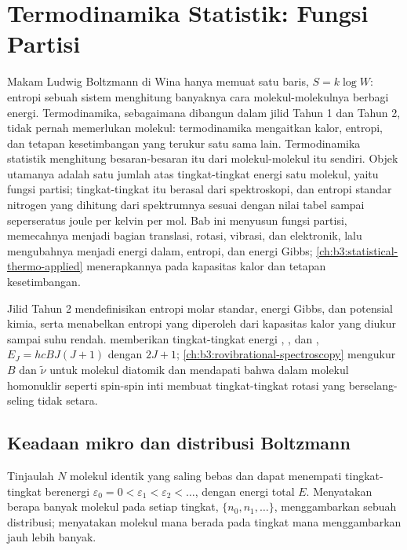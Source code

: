 \chapter{Termodinamika Statistik: Fungsi Partisi}\label{ch:b3:partition-functions}

Makam Ludwig Boltzmann di Wina hanya memuat satu baris, $S = k\log W$: entropi
sebuah sistem menghitung banyaknya cara molekul-molekulnya berbagi energi.
Termodinamika, sebagaimana dibangun dalam jilid Tahun 1 dan Tahun 2, tidak
pernah memerlukan molekul: termodinamika mengaitkan kalor, entropi, dan
tetapan kesetimbangan yang terukur satu sama lain. Termodinamika statistik
menghitung besaran-besaran itu dari molekul-molekul itu sendiri. Objek
utamanya adalah satu jumlah atas tingkat-tingkat energi satu molekul, yaitu
fungsi partisi; tingkat-tingkat itu berasal dari spektroskopi, dan entropi
standar nitrogen yang dihitung dari spektrumnya sesuai dengan nilai tabel
sampai seperseratus joule per kelvin per mol. Bab ini menyusun fungsi partisi,
memecahnya menjadi bagian translasi, rotasi, vibrasi, dan elektronik, lalu
mengubahnya menjadi energi dalam, entropi, dan energi Gibbs;
\cref{ch:b3:statistical-thermo-applied} menerapkannya pada kapasitas kalor dan
tetapan kesetimbangan.

\begin{recall}
Jilid Tahun 2 mendefinisikan entropi molar standar, energi Gibbs, dan potensial
kimia, serta menabelkan entropi yang diperoleh dari kapasitas kalor yang diukur
sampai suhu rendah.  memberikan tingkat-tingkat
energi , , dan ,
$E_J = hcBJ(J+1)$ dengan  $2J + 1$;
\cref{ch:b3:rovibrational-spectroscopy} mengukur $B$ dan $\tilde\nu$ untuk
molekul diatomik dan mendapati bahwa dalam molekul homonuklir seperti 
spin-spin inti membuat tingkat-tingkat rotasi yang berselang-seling tidak
setara.
\end{recall}

\section{Keadaan mikro dan distribusi Boltzmann}

Tinjaulah $N$ molekul identik yang saling bebas dan dapat menempati
tingkat-tingkat berenergi $\varepsilon_0 = 0 < \varepsilon_1 < \varepsilon_2 < \dots$,
dengan energi total $E$. Menyatakan berapa banyak molekul pada setiap tingkat,
$\{n_0, n_1, \dots\}$, menggambarkan sebuah distribusi; menyatakan molekul mana
berada pada tingkat mana menggambarkan jauh lebih banyak.

